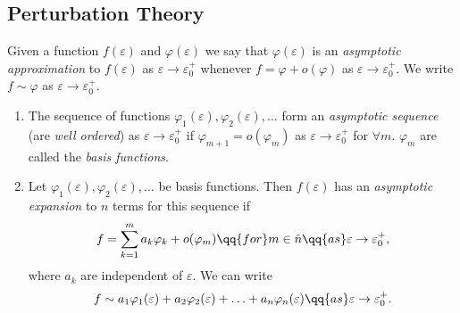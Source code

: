
\subsection{Perturbation Theory}%
\label{sub:perturbation_theory}


\begin{frame}
    \begin{definition}
        Given a function \(f(\varepsilon)\) and \(\varphi(\varepsilon)\) we say that \(\varphi(\varepsilon)\) is an
        \emph{asymptotic approximation} to \(f(\varepsilon)\) as \(\varepsilon \to \varepsilon_0^{+}\) whenever \(f
        = \varphi + o(\varphi)\) as \(\varepsilon \to \varepsilon_0^{+}\). We write \(f \sim \varphi\) as \(\varepsilon
        \to \varepsilon_0^{+}\).
    \end{definition}
\end{frame}

\begin{frame}
    \begin{definition}
        \begin{enumerate}
            \item The sequence of functions \(\varphi_1(\varepsilon), \varphi_2(\varepsilon),\ldots\) form an
              \emph{asymptotic sequence} (are \emph{well ordered}) as \(\varepsilon \to \varepsilon_0^{+}\) if
              \(\varphi_{m+1} = o(\varphi_m)\) as \(\varepsilon \to \varepsilon_0^{+}\) for \(\forall m\).
                \pause \(\varphi_m\) are called the \emph{basis functions}. \pause
            \item<+-> Let \(\varphi_1(\varepsilon), \varphi_2(\varepsilon),\ldots\) be basis functions. Then
                \(f(\varepsilon)\) has an \emph{asymptotic expansion} to \(n\) terms for this sequence if \[
                    f =\sum_{k = 1}^{m} a_k \varphi_k + o(\varphi_m) \qq{for} m \in \hat{n} \qq{as} \varepsilon \to
                    \varepsilon_0^{+},
                \] 
                where \(a_k\) are independent of \(\varepsilon\). We can write \[
                    f \sim a_1 \varphi_1(\varepsilon) + a_2 \varphi_2(\varepsilon) + \ldots + a_n \varphi_n(\varepsilon)
                    \qq{as} \varepsilon \to \varepsilon_0^{+}.
                \]
        \end{enumerate}
    \end{definition}
\end{frame}

